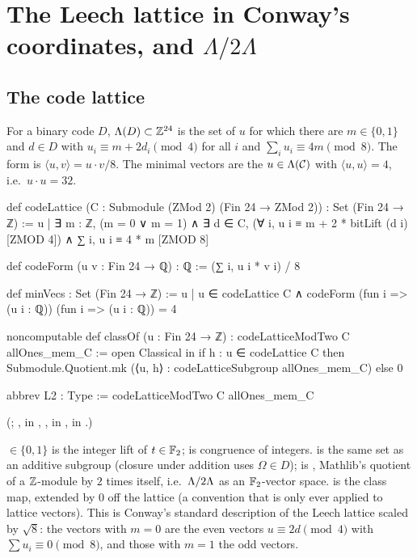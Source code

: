 \section{The Leech lattice in Conway's coordinates, and \texorpdfstring{$\Lambda/2\Lambda$}{Lambda/2Lambda}}\label{ch21:sec:leech}

\subsection{The code lattice}

\begin{definition}\label{ch21:def:codeLattice}
For a binary code $D$, $\Lambda(D)\subset{\mathbb{Z}}^{24}$ is the set of $u$ for which there are
$m\in\{0,1\}$ and $d\in D$ with $u_i\equiv m+2d_i\pmod 4$ for all $i$ and
$\sum_iu_i\equiv4m\pmod8$.  The form is $\langle u,v\rangle=u\cdot v/8$.  The minimal vectors are the
$u\in\Lambda(\mathcal{C})$ with $\langle u,u\rangle=4$, i.e.\ $u\cdot u=32$.
\end{definition}
\begin{leancode}
def codeLattice (C : Submodule (ZMod 2) (Fin 24 → ZMod 2)) : Set (Fin 24 → ℤ) :=
  {u | ∃ m : ℤ, (m = 0 ∨ m = 1) ∧ ∃ d ∈ C,
    (∀ i, u i ≡ m + 2 * bitLift (d i) [ZMOD 4]) ∧ ∑ i, u i ≡ 4 * m [ZMOD 8]}

def codeForm (u v : Fin 24 → ℚ) : ℚ := (∑ i, u i * v i) / 8
\end{leancode}
\begin{leancode}
def minVecs : Set (Fin 24 → ℤ) :=
  {u | u ∈ codeLattice C ∧ codeForm (fun i => (u i : ℚ)) (fun i => (u i : ℚ)) = 4}
\end{leancode}
\begin{leancode}
noncomputable def classOf (u : Fin 24 → ℤ) : codeLatticeModTwo C allOnes_mem_C :=
  open Classical in
  if h : u ∈ codeLattice C then Submodule.Quotient.mk (⟨u, h⟩ : codeLatticeSubgroup allOnes_mem_C)
  else 0
\end{leancode}
\begin{leancode}
abbrev L2 : Type := codeLatticeModTwo C allOnes_mem_C
\end{leancode}
(; ,  in
, ,  in ,  in
.)
\begin{dictionary}
 $\in\{0,1\}$ is the integer lift of $t\in\mathbb{F}_2$;  is
congruence of integers.   is the same set as an additive subgroup (closure
under addition uses $\Omega\in D$);  is ,
Mathlib's quotient of a ${\mathbb{Z}}$-module by $2$ times itself, i.e.\ ${\Lambda}/2{\Lambda}$ as an
$\mathbb{F}_2$-vector space.   is the class map, extended by $0$ off the lattice (a
convention that is only ever applied to lattice vectors).  This is Conway's standard description of
the Leech lattice scaled by $\sqrt8$: the vectors with $m=0$ are the even vectors $u\equiv2d\pmod4$
with $\sum u_i\equiv0\pmod8$, and those with $m=1$ the odd vectors.
\end{dictionary}
